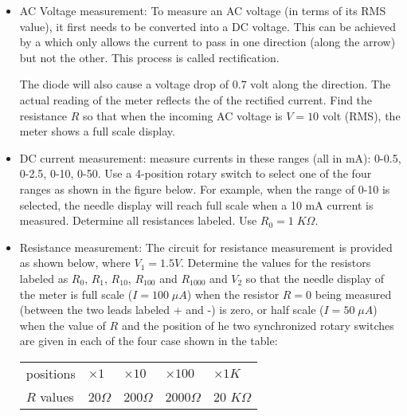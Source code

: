 \begin{enumerate}
\begin{itemize}

    \item AC Voltage measurement: To measure an AC voltage (in terms of its
      RMS value), it first needs to be converted into a DC voltage. This can 
      be achieved by a 
      which only allows the current to pass in one
      direction (along the arrow) but not the other. This process is called
      rectification. 


      The diode will also cause a voltage drop of 0.7 volt 
      along the direction. The actual reading of the meter reflects the 
      of the rectified current. Find the resistance $R$ so 
      that when the incoming AC voltage is $V=10$ volt (RMS), the meter shows 
      a full scale display.


    \item DC current measurement: measure currents in these ranges (all in mA):
      0-0.5, 0-2.5, 0-10, 0-50. Use a 4-position rotary switch to select one 
      of the four ranges as shown in the figure below. For example, when the 
      range of 0-10 is selected, the needle display will reach full scale when 
      a 10 mA current is measured. Determine all resistances labeled. Use
      $R_0=1\;K\Omega$.


    \item Resistance measurement: The circuit for resistance measurement is
      provided as shown below, where $V_1=1.5V$. Determine the values for the 
      resistors labeled as $R_0$, $R_1$, $R_{10}$, $R_{100}$ and $R_{1000}$ 
      and $V_2$ so that the needle display of the meter is full scale 
      ($I=100\;\mu A$) when the resistor $R=0$ being measured (between the 
      two leads labeled + and -) is zero, or half scale ($I=50\;\mu A$) when 
      the value of $R$ and the position of he two synchronized rotary switches
      are given in each of the four case shown in the table:

      \begin{tabular}{l|llll} \hline
	positions  & $\times 1$ & $\times 10$ & $\times 100$ & $\times 1K$ \\
	$R$ values & 20$\Omega$ & 200$\Omega$ & 2000$\Omega$ & 20 $K\Omega$ 
      \end{tabular}


  \end{itemize}

\end{enumerate}


